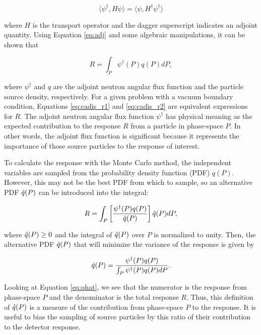 \begin{equation} 
\langle \psi^{\dagger}, H\psi\rangle=\langle\psi , H^{\dagger}\psi^{\dagger}\rangle
\label{eq:adj}
\end{equation}

\noindent where $H$ is the transport operator and the dagger superscript indicates an 
adjoint quantity. Using Equation \ref{eq:adj} and some algebraic manipulations, it 
can be shown that

\begin{equation}
R = \int_P \psi^{\dagger}(P)q(P)dP,
\label{eq:cadis_r2}
\end{equation}

\noindent where $\psi^{\dagger}$ and $q$ are the adjoint neutron angular flux function
and the particle source density, respectively. For a given problem with a vacuum 
boundary condition, Equations \ref{eq:cadis_r1} and \ref{eq:cadis_r2} are equivalent 
expressions for $R$. The adjoint neutron angular flux function $\psi^{\dagger}$ has 
physical meaning as the expected contribution to the response $R$ from a particle in 
phase-space $P$. In other words, the adjoint flux function is significant because it 
represents the importance of those source particles to the response of interest.

To calculate the response with the Monte Carlo method, the independent variables are
sampled from the probability density function (PDF) $q(P)$. However, this may not be
the best PDF from which to sample, so an alternative PDF $\hat{q}(P)$ can be introduced
into the integral:

\begin{equation}
R = \int_P \left[\frac{\psi^{\dagger}(P)q(P)}{\hat{q}(P)}\right]\hat{q}(P)dP,
\end{equation}

\noindent where $\hat{q}(P) \geq 0$ and the integral of $\hat{q}(P)$ over $P$ is 
normalized to unity. Then, the alternative PDF $\hat{q}(P)$ that will minimize the 
variance of the response is given by

\begin{equation}
\hat{q}(P) = \frac{\psi^{\dagger}(P)q(P)}{\int_P\psi^{\dagger}(P)q(P)dP}.
\label{eq:qhat}
\end{equation}

\noindent Looking at Equation \ref{eq:qhat}, we see that the numerator is the 
response from phase-space $P$ and the denominator is the total response $R$. Thus, 
this definition of $\hat{q}(P)$ is a measure of the contribution from phase-space $P$ 
to the response. It is useful to bias the sampling of source particles by this ratio 
of their contribution to the detector response.

